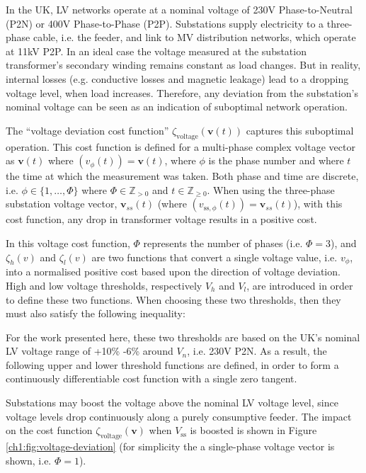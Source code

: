 In the UK, LV networks operate at a nominal voltage of 230V Phase-to-Neutral (P2N) or 400V Phase-to-Phase (P2P).
Substations supply electricity to a three-phase cable, i.e. the feeder, and  link to MV distribution networks, which operate at 11kV P2P.
In an ideal case the voltage measured at the substation transformer's secondary winding remains constant as load changes.
But in reality, internal losses (e.g. conductive losses and magnetic leakage) lead to a dropping voltage level, when load increases.
Therefore, any deviation from the substation's nominal voltage can be seen as an indication of suboptimal network operation.

The ``voltage deviation cost function'' $\zeta_\text{voltage}(\textbf{v}(t))$ captures this suboptimal operation.
This cost function is defined for a multi-phase complex voltage vector as $\textbf{v}(t)$ where $(v_\phi(t)) = \textbf{v}(t)$, where $\phi$ is the phase number and where $t$ the time at which the measurement was taken.
Both phase and time are discrete, i.e. $\phi \in \{1,\dots,\Phi\}$ where $\Phi \in \mathbb{Z}_{>0}$ and $t \in \mathbb{Z}_{\geq0}$.
When using the three-phase substation voltage vector, $\textbf{v}_{ss}(t)$ (where $(v_{\text{ss},\phi}(t)) = \textbf{v}_{ss}(t)$), with this cost function, any drop in transformer voltage results in a positive cost.



In this voltage cost function, $\Phi$ represents the number of phases (i.e. $\Phi = 3$), and $\zeta_h(v)$ and $\zeta_l(v)$ are two functions that convert a single voltage value, i.e. $v_\phi$, into a normalised positive cost based upon the direction of voltage deviation.
High and low voltage thresholds, respectively $V_h$ and $V_l$, are introduced in order to define these two functions.
When choosing these two thresholds, then they must also satisfy the following inequality:



For the work presented here, these two thresholds are based on the UK's nominal LV voltage range of +10\% -6\% around $V_n$, i.e. 230V P2N.
As a result, the following upper and lower threshold functions are defined, in order to form a continuously differentiable cost function with a single zero tangent.



Substations may boost the voltage above the nominal LV voltage level, since voltage levels drop continuously along a purely consumptive feeder.
The impact on the cost function $\zeta_\text{voltage}(\textbf{v})$ when $V_\text{ss}$ is boosted is shown in Figure \ref{ch1:fig:voltage-deviation} (for simplicity the a single-phase voltage vector is shown, i.e. $\Phi = 1$).

